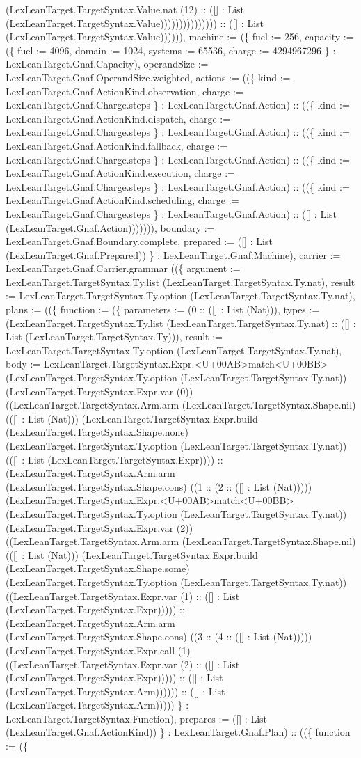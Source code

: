 \documentclass[11pt]{article}
\begin{document}
(LexLeanTarget.TargetSyntax.Value.nat (12) :: ([] : List (LexLeanTarget.TargetSyntax.Value))))))))))))))) :: ([] : List (LexLeanTarget.TargetSyntax.Value)))))), machine := (\{ fuel := 256, capacity := (\{ fuel := 4096, domain := 1024, systems := 65536, charge := 4294967296 \} : LexLeanTarget.Gnaf.Capacity), operandSize := LexLeanTarget.Gnaf.OperandSize.weighted, actions := ((\{ kind := LexLeanTarget.Gnaf.ActionKind.observation, charge := LexLeanTarget.Gnaf.Charge.steps \} : LexLeanTarget.Gnaf.Action) :: ((\{ kind := LexLeanTarget.Gnaf.ActionKind.dispatch, charge := LexLeanTarget.Gnaf.Charge.steps \} : LexLeanTarget.Gnaf.Action) :: ((\{ kind := LexLeanTarget.Gnaf.ActionKind.fallback, charge := LexLeanTarget.Gnaf.Charge.steps \} : LexLeanTarget.Gnaf.Action) :: ((\{ kind := LexLeanTarget.Gnaf.ActionKind.execution, charge := LexLeanTarget.Gnaf.Charge.steps \} : LexLeanTarget.Gnaf.Action) :: ((\{ kind := LexLeanTarget.Gnaf.ActionKind.scheduling, charge := LexLeanTarget.Gnaf.Charge.steps \} : LexLeanTarget.Gnaf.Action) :: ([] : List (LexLeanTarget.Gnaf.Action))))))), boundary := LexLeanTarget.Gnaf.Boundary.complete, prepared := ([] : List (LexLeanTarget.Gnaf.Prepared)) \} : LexLeanTarget.Gnaf.Machine), carrier := LexLeanTarget.Gnaf.Carrier.grammar ((\{ argument := LexLeanTarget.TargetSyntax.Ty.list (LexLeanTarget.TargetSyntax.Ty.nat), result := LexLeanTarget.TargetSyntax.Ty.option (LexLeanTarget.TargetSyntax.Ty.nat), plans := ((\{ function := (\{ parameters := (0 :: ([] : List (Nat))), types := (LexLeanTarget.TargetSyntax.Ty.list (LexLeanTarget.TargetSyntax.Ty.nat) :: ([] : List (LexLeanTarget.TargetSyntax.Ty))), result := LexLeanTarget.TargetSyntax.Ty.option (LexLeanTarget.TargetSyntax.Ty.nat), body := LexLeanTarget.TargetSyntax.Expr.<U+00AB>match<U+00BB> (LexLeanTarget.TargetSyntax.Ty.option (LexLeanTarget.TargetSyntax.Ty.nat)) (LexLeanTarget.TargetSyntax.Expr.var (0)) ((LexLeanTarget.TargetSyntax.Arm.arm (LexLeanTarget.TargetSyntax.Shape.nil) (([] : List (Nat))) (LexLeanTarget.TargetSyntax.Expr.build (LexLeanTarget.TargetSyntax.Shape.none) (LexLeanTarget.TargetSyntax.Ty.option (LexLeanTarget.TargetSyntax.Ty.nat)) (([] : List (LexLeanTarget.TargetSyntax.Expr)))) :: (LexLeanTarget.TargetSyntax.Arm.arm (LexLeanTarget.TargetSyntax.Shape.cons) ((1 :: (2 :: ([] : List (Nat))))) (LexLeanTarget.TargetSyntax.Expr.<U+00AB>match<U+00BB> (LexLeanTarget.TargetSyntax.Ty.option (LexLeanTarget.TargetSyntax.Ty.nat)) (LexLeanTarget.TargetSyntax.Expr.var (2)) ((LexLeanTarget.TargetSyntax.Arm.arm (LexLeanTarget.TargetSyntax.Shape.nil) (([] : List (Nat))) (LexLeanTarget.TargetSyntax.Expr.build (LexLeanTarget.TargetSyntax.Shape.some) (LexLeanTarget.TargetSyntax.Ty.option (LexLeanTarget.TargetSyntax.Ty.nat)) ((LexLeanTarget.TargetSyntax.Expr.var (1) :: ([] : List (LexLeanTarget.TargetSyntax.Expr))))) :: (LexLeanTarget.TargetSyntax.Arm.arm (LexLeanTarget.TargetSyntax.Shape.cons) ((3 :: (4 :: ([] : List (Nat))))) (LexLeanTarget.TargetSyntax.Expr.call (1) ((LexLeanTarget.TargetSyntax.Expr.var (2) :: ([] : List (LexLeanTarget.TargetSyntax.Expr))))) :: ([] : List (LexLeanTarget.TargetSyntax.Arm)))))) :: ([] : List (LexLeanTarget.TargetSyntax.Arm))))) \} : LexLeanTarget.TargetSyntax.Function), prepares := ([] : List (LexLeanTarget.Gnaf.ActionKind)) \} : LexLeanTarget.Gnaf.Plan) :: ((\{ function := (\{ 
\end{document}
